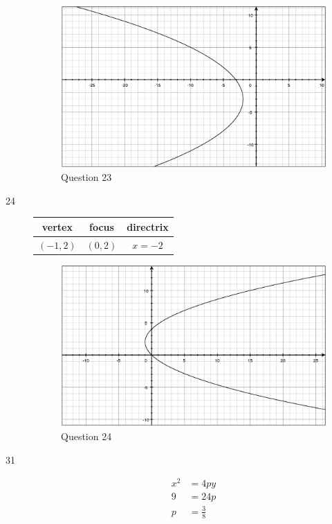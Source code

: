 \documentclass[fleqn,addpoints]{exam}
\begin{document}
\begin{description}
\begin{figure}[H]
  \centering
  \includegraphics[scale=.3]{question23.eps}
  \caption*{Question 23}
\end{figure}

\item[24]
\begin{tabular}{ccc}
\toprule
vertex & focus & directrix \\
\midrule
  $(-1, 2)$ & $\left(0, 2 \right)$ & $x = -2$ \\
\bottomrule
\end{tabular}

\begin{figure}[H]
  \centering
  \includegraphics[scale=.3]{question24.eps}
  \caption*{Question 24}
\end{figure}

\item[31]
\begin{align*}
  x^2 &= 4 py \\
  9 &= 24 p \\
  p &= \frac{3}{8} \\
\end{align*}


\end{description}
\end{document}
